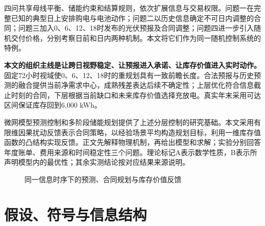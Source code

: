 \documentclass[UTF8,a4paper,zihao=-4,fontset=mac]{ctexart}
\begin{document}
四问共享母线平衡、储能约束和结算规则，依次扩展信息与交易权限。问题一在完整已知的典型日上安排购电与电池动作；问题二以历史信息确定不可日内调整的合同；问题三加入0、6、12、18时发布的光伏预报及合同调整；问题四进一步引入随机交付价格，分别考察日前和日内两种机制。本文将它们作为同一随机控制系统的特例。

\textbf{本文的组织主线是让跨日视野稳定、让预报进入承诺、让库存价值进入实时动作。}固定72小时视域使0、6、12、18时的重规划具有一致前瞻长度。合法预报与历史预测的融合提供当前净需求中心，成熟残差表达后续不确定性；上层优化符合信息截止时刻的合同，下层根据当前缺口和未来库存价值选择充放电。真实年末采用可达区间保证库存回到6,000 kWh。

微网模型预测控制和多阶段储能规划提供了上述分层控制的研究基础\cite{parisio2014,parisio2016,bhattacharya2018}。本文采用有限维因果扰动反馈表示合同策略\cite{bental2004,goulart2006}，以经验场景平均构造规划目标\cite{kleywegt2002,shapiro2014}，利用一维库存值函数的凸结构实现反馈。正文先解释物理机制，再给出模型和求解；实验分别回答年度账单、费用来源和时间稳定性三个问题。理论标记A表示数学性质，B表示所声明模型内的最优性；其余实测结论按对应结果来源说明。

\begin{figure}[htbp]\centering
{}
\caption{同一信息时序下的预测、合同规划与库存价值反馈}
\end{figure}
\section{假设、符号与信息结构}
\end{document}
